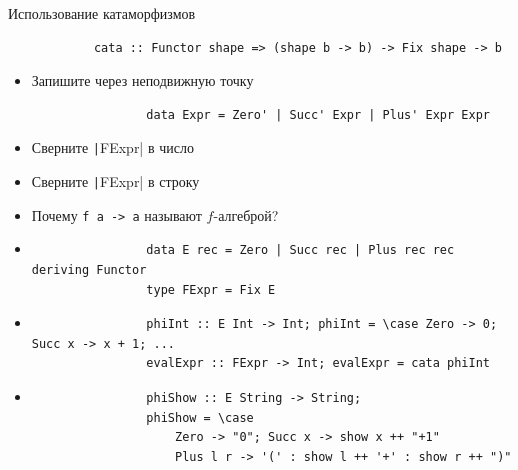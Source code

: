     \begin{frame}[fragile]{Использование катаморфизмов}
        \begin{verbatim}
            cata :: Functor shape => (shape b -> b) -> Fix shape -> b
        \end{verbatim}
        \begin{itemize}
            \item[\todo] Запишите через неподвижную точку
            \begin{verbatim}
                data Expr = Zero' | Succ' Expr | Plus' Expr Expr
            \end{verbatim}
            \item[\todo] Сверните \texttt|FExpr| в число
            \item[\todo] Сверните \texttt|FExpr| в строку
            \item[\todo] Почему \texttt{f a -> a} называют $f$-алгеброй?
            \item[\answer] \pause
            \begin{verbatim}
                data E rec = Zero | Succ rec | Plus rec rec deriving Functor
                type FExpr = Fix E
            \end{verbatim}
            \item[\answer] \pause
            \begin{verbatim}
                phiInt :: E Int -> Int; phiInt = \case Zero -> 0; Succ x -> x + 1; ...
                evalExpr :: FExpr -> Int; evalExpr = cata phiInt
            \end{verbatim}
            \item[\answer] \pause
            \begin{verbatim}
                phiShow :: E String -> String;
                phiShow = \case
                    Zero -> "0"; Succ x -> show x ++ "+1"
                    Plus l r -> '(' : show l ++ '+' : show r ++ ")"
            \end{verbatim}
        \end{itemize}
    \end{frame}

